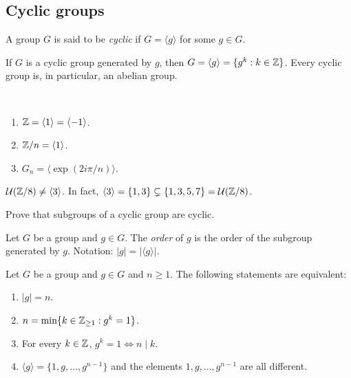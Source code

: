 \subsection{Cyclic groups}

\begin{definition}
        A group $G$ is said to be \emph{cyclic} if 
        $G=\langle g\rangle$ for some 
        $g\in G$.
\end{definition}

If $G$ is a cyclic group generated by $g$, then 
$G=\langle g\rangle=\{g^k:k\in\mathbb{Z}\}$. Every cyclic group is, 
in particular, an abelian group. 

\begin{example}\
\begin{enumerate}
        \item $\mathbb{Z}=\langle 1\rangle=\langle -1\rangle$.
        \item $\mathbb{Z}/n=\langle 1\rangle$.
        \item $G_n=\langle \exp(2i\pi/n)\rangle$.
\end{enumerate}
\end{example}

\begin{example}
        $\mathcal{U}(\mathbb{Z}/8)\ne\langle 3\rangle$. In fact, $\langle 3\rangle=\{1,3\}\subsetneq\{1,3,5,7\}=\mathcal{U}(\mathbb{Z}/8)$.
\end{example}

\begin{exercise}
\label{xca:subgroups_cyclic}
        Prove that subgroups of a cyclic group are cyclic.
\end{exercise}

\begin{definition}
        Let $G$ be a group and $g\in G$. The \emph{order} of $g$
        is the order of the subgroup generated by $g$. Notation:
        $|g|=|\langle g\rangle|$.
\end{definition}


\begin{theorem}
        Let $G$ be a group and $g\in G$ and $n\geq1$. 
        The following statements are equivalent:
        \begin{enumerate}
                \item $|g|=n$.
                \item $n=\min\{k\in\mathbb{Z}_{\geq1}:g^k=1\}$.
                \item For every $k\in\mathbb{Z}$, $g^k=1\Longleftrightarrow n\mid k$.
                \item $\langle g\rangle=\{1,g,\dots,g^{n-1}\}$ and 
                the elements $1,g,\dots,g^{n-1}$ are all different.
        \end{enumerate}
\end{theorem}


